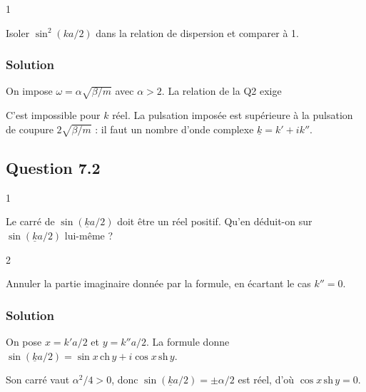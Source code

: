 \documentclass[11pt,a4paper]{article}
\newcommand{\equationajustee}[1]{%
  \sbox{\boiteequation}{$\displaystyle #1$}%
  \ifdim\wd\boiteequation>\linewidth
    \[\resizebox{\linewidth}{!}{\usebox{\boiteequation}}\]%
  \else
    \[#1\]%
  \fi}
\begin{document}
\begin{indication}{1}

Isoler \(\sin^2(ka/2)\) dans la relation de dispersion et comparer à 1.

\end{indication}

\hypertarget{solution-6}{%
\subsubsection{Solution}\label{solution-6}}

On impose \(\omega=\alpha\sqrt{\beta/m}\) avec \(\alpha>2\). La relation de la Q2 exige

\equationajustee{\sin^2\frac{ka}{2}=\frac{m\omega^2}{4\beta}=\frac{\alpha^2}{4}>1}

C'est impossible pour \(k\) réel. La pulsation imposée est supérieure à la pulsation de coupure \(2\sqrt{\beta/m}\) : il faut un nombre d'onde complexe \(\underline k=k'+ik''\).

\hypertarget{question-7.2}{%
\subsection{Question 7.2}\label{question-7.2}}

\begin{indication}{1}

Le carré de \(\sin(\underline ka/2)\) doit être un réel positif. Qu'en déduit-on sur \(\sin(\underline ka/2)\) lui-même ?

\end{indication}

\begin{indication}{2}

Annuler la partie imaginaire donnée par la formule, en écartant le cas \(k''=0\).

\end{indication}

\hypertarget{solution-7}{%
\subsubsection{Solution}\label{solution-7}}

On pose \(x=k'a/2\) et \(y=k''a/2\). La formule donne \(\sin(\underline ka/2)=\sin x\,\mathrm{ch}\,y+i\cos x\,\mathrm{sh}\,y\).

Son carré vaut \(\alpha^2/4>0\), donc \(\sin(\underline ka/2)=\pm\alpha/2\) est réel, d'où \(\cos x\,\mathrm{sh}\,y=0\).
\end{document}
